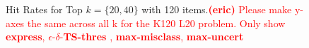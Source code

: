 \documentclass[nonblindrev]{informs3}
\newcommand{\eric}[1]{\textcolor{red}{\textbf{(eric)} #1}}
\newcommand{\fixedexpress}{\textbf{express}}
\newcommand{\mismin}{\textbf{max-misclass}}
\newcommand{\edtsthres}{$\epsilon$-$\delta$-\textbf{TS-thres} }
\newcommand{\uncert}{\textbf{max-uncert} }
\begin{document}
\begin{figure}%
    \caption{Hit Rates for Top $k=\{20,40\}$ with 120 items.\eric{Please make y-axes the same across all k for the K120 L20 problem. Only show \fixedexpress, \edtsthres, \mismin, \uncert }}%
    \label{fig:K120_L20_k20hit_k40hit}%
 	\begin{center}
    \qquad
    \end{center}
\end{figure}


\end{document}
